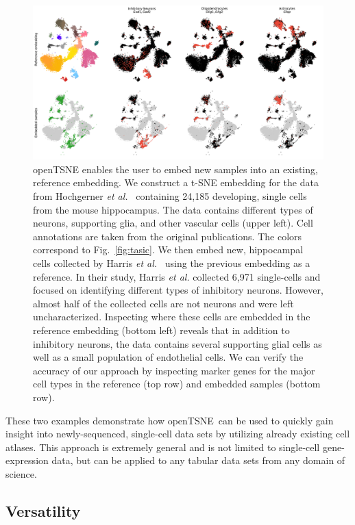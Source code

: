 \documentclass[twocolumn]{bmcart}
\newcommand{\opentsne}{\textsf{openTSNE}}
\begin{document}
\begin{figure}[htbp]
  \includegraphics[width=\textwidth]{transform_hochgerner}
  \caption{\label{fig:transform}openTSNE enables the user to embed new samples
	into an existing, reference embedding. We construct a t-SNE embedding
	for the data from Hochgerner \textit{et
	al.}~\cite{hochgerner2018conserved} containing 24,185 developing,
	single cells from the mouse hippocampus. The data contains different
	types of neurons, supporting glia, and other vascular cells (upper
	left). Cell annotations are taken from the original publications. The
	colors correspond to Fig.~\ref{fig:tasic}. We then embed new,
	hippocampal cells collected by Harris \textit{et
	al.}~\cite{harris2018classes} using the previous embedding as a
	reference. In their study, Harris \textit{et al.} collected 6,971
	single-cells and focused on identifying different types of inhibitory
	neurons. However, almost half of the collected cells are not neurons
	and were left uncharacterized. Inspecting where these cells are
	embedded in the reference embedding (bottom left) reveals that in
	addition to inhibitory neurons, the data contains several supporting
	glial cells as well as a small population of endothelial cells. We can
	verify the accuracy of our approach by inspecting marker genes for the
	major cell types in the reference (top row) and embedded samples
	(bottom row).}
\end{figure}

These two examples demonstrate how \opentsne\ can be used to quickly gain
insight into newly-sequenced, single-cell data sets by utilizing already
existing cell atlases. This approach is extremely
general and is not limited to single-cell gene-expression data, but can be
applied to any tabular data sets from any domain of science.

\subsection*{Versatility}
\end{document}
